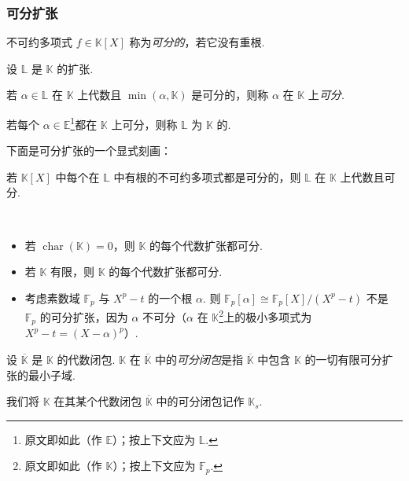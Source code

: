 \subsubsection{可分扩张}

\begin{definition}\label{c2-def-1-7}
不可约多项式 $f\in\mathbb{K}[X]$ 称为\emph{可分的}，若它没有重根.
\end{definition}

\begin{definition}\label{c2-def-1-8}
设 $\mathbb{L}$ 是 $\mathbb{K}$ 的扩张.

若 $\alpha\in\mathbb{L}$ 在 $\mathbb{K}$ 上代数且 $\min(\alpha,\mathbb{K})$ 是可分的，则称 $\alpha$ 在 $\mathbb{K}$ 上\emph{可分}.

若每个 $\alpha\in\mathbb{E}$\footnote{原文即如此（作 $\mathbb{E}$）；按上下文应为 $\mathbb{L}$.}都在 $\mathbb{K}$ 上可分，则称 $\mathbb{L}$ 为 $\mathbb{K}$ 的.
\end{definition}

\begin{remark}\label{c2-rem-1-9}
下面是可分扩张的一个显式刻画：

若 $\mathbb{K}[X]$ 中每个在 $\mathbb{L}$ 中有根的不可约多项式都是可分的，则 $\mathbb{L}$ 在 $\mathbb{K}$ 上代数且可分.
\end{remark}

\begin{examples}\label{c2-ex-1-10}
\
\begin{itemize}
    \item 若 $\operatorname{char}(\mathbb{K})=0$，则 $\mathbb{K}$ 的每个代数扩张都可分.
    \item 若 $\mathbb{K}$ 有限，则 $\mathbb{K}$ 的每个代数扩张都可分.
    \item 考虑素数域 $\mathbb{F}_p$ 与 $X^{p}-t$ 的一个根 $\alpha$. 则 $\mathbb{F}_p[\alpha]\cong\mathbb{F}_p[X]/(X^{p}-t)$ 不是 $\mathbb{F}_p$ 的可分扩张，因为 $\alpha$ 不可分（$\alpha$ 在 $\mathbb{K}$\footnote{原文即如此（作 $\mathbb{K}$）；按上下文应为 $\mathbb{F}_p$.}上的极小多项式为 $X^{p}-t=(X-\alpha)^{p}$）.
\end{itemize}
\end{examples}

\begin{definition}\label{c2-def-1-11}
设 $\overline{\mathbb{K}}$ 是 $\mathbb{K}$ 的代数闭包. $\mathbb{K}$ 在 $\overline{\mathbb{K}}$ 中的\emph{可分闭包}是指 $\overline{\mathbb{K}}$ 中包含 $\mathbb{K}$ 的一切有限可分扩张的最小子域.

我们将 $\mathbb{K}$ 在其某个代数闭包 $\overline{\mathbb{K}}$ 中的可分闭包记作 $\mathbb{K}_s$.
\end{definition}

